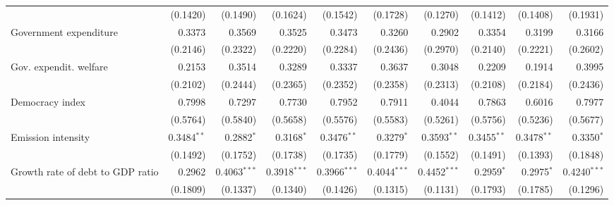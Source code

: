 \begin{tabular}{lrrrrrrrrr}
                                 &          (0.1420) &          (0.1490) &          (0.1624) &          (0.1542) &          (0.1728) &          (0.1270) &          (0.1412) &          (0.1408) &          (0.1931) \\
Government expenditure           &            0.3373 &            0.3569 &            0.3525 &            0.3473 &            0.3260 &            0.2902 &            0.3354 &            0.3199 &            0.3166 \\
                                 &          (0.2146) &          (0.2322) &          (0.2220) &          (0.2284) &          (0.2436) &          (0.2970) &          (0.2140) &          (0.2221) &          (0.2602) \\
Gov. expendit. welfare           &            0.2153 &            0.3514 &            0.3289 &            0.3337 &            0.3637 &            0.3048 &            0.2209 &            0.1914 &            0.3995 \\
                                 &          (0.2102) &          (0.2444) &          (0.2365) &          (0.2352) &          (0.2358) &          (0.2313) &          (0.2108) &          (0.2184) &          (0.2436) \\
Democracy index                  &            0.7998 &            0.7297 &            0.7730 &            0.7952 &            0.7911 &            0.4044 &            0.7863 &            0.6016 &            0.7977 \\
                                 &          (0.5764) &          (0.5840) &          (0.5658) &          (0.5576) &          (0.5583) &          (0.5261) &          (0.5756) &          (0.5236) &          (0.5677) \\
Emission intensity               &    0.3484$^{* *}$ &      0.2882$^{*}$ &      0.3168$^{*}$ &    0.3476$^{* *}$ &      0.3279$^{*}$ &    0.3593$^{* *}$ &    0.3455$^{* *}$ &    0.3478$^{* *}$ &      0.3350$^{*}$ \\
                                 &          (0.1492) &          (0.1752) &          (0.1738) &          (0.1735) &          (0.1779) &          (0.1552) &          (0.1491) &          (0.1393) &          (0.1848) \\
Growth rate of debt to GDP ratio &            0.2962 &  0.4063$^{* * *}$ &  0.3918$^{* * *}$ &  0.3966$^{* * *}$ &  0.4044$^{* * *}$ &  0.4452$^{* * *}$ &      0.2959$^{*}$ &      0.2975$^{*}$ &  0.4240$^{* * *}$ \\
                                 &          (0.1809) &          (0.1337) &          (0.1340) &          (0.1426) &          (0.1315) &          (0.1131) &          (0.1793) &          (0.1785) &          (0.1296) \\

\end{tabular}
